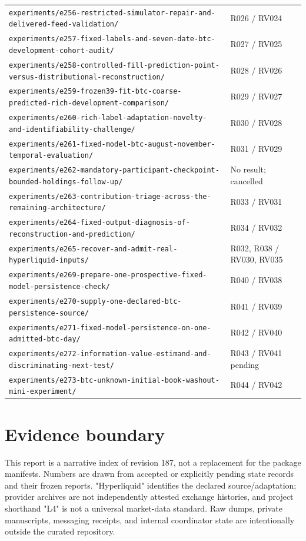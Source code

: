 \documentclass[10pt,a4paper]{article}
\begin{document}
\begin{longtable}{@{}p{}p{}@{}}
\nolinkurl{experiments/e256-restricted-simulator-repair-and-delivered-feed-validation/} & R026 / RV024\\
\nolinkurl{experiments/e257-fixed-labels-and-seven-date-btc-development-cohort-audit/} & R027 / RV025\\
\nolinkurl{experiments/e258-controlled-fill-prediction-point-versus-distributional-reconstruction/} & R028 / RV026\\
\nolinkurl{experiments/e259-frozen39-fit-btc-coarse-predicted-rich-development-comparison/} & R029 / RV027\\
\nolinkurl{experiments/e260-rich-label-adaptation-novelty-and-identifiability-challenge/} & R030 / RV028\\
\nolinkurl{experiments/e261-fixed-model-btc-august-november-temporal-evaluation/} & R031 / RV029\\
\nolinkurl{experiments/e262-mandatory-participant-checkpoint-bounded-holdings-follow-up/} & No result; cancelled\\
\nolinkurl{experiments/e263-contribution-triage-across-the-remaining-architecture/} & R033 / RV031\\
\nolinkurl{experiments/e264-fixed-output-diagnosis-of-reconstruction-and-prediction/} & R034 / RV032\\
\nolinkurl{experiments/e265-recover-and-admit-real-hyperliquid-inputs/} & R032, R038 / RV030, RV035\\
\nolinkurl{experiments/e269-prepare-one-prospective-fixed-model-persistence-check/} & R040 / RV038\\
\nolinkurl{experiments/e270-supply-one-declared-btc-persistence-source/} & R041 / RV039\\
\nolinkurl{experiments/e271-fixed-model-persistence-on-one-admitted-btc-day/} & R042 / RV040\\
\nolinkurl{experiments/e272-information-value-estimand-and-discriminating-next-test/} & R043 / RV041 pending\\
\nolinkurl{experiments/e273-btc-unknown-initial-book-washout-mini-experiment/} & R044 / RV042\\
\bottomrule\end{longtable}\endgroup
\section{Evidence boundary}
This report is a narrative index of revision 187, not a replacement for the package manifests. Numbers are drawn from accepted or explicitly pending state records and their frozen reports. "Hyperliquid" identifies the declared source/adaptation; provider archives are not independently attested exchange histories, and project shorthand "L4" is not a universal market-data standard. Raw dumps, private manuscripts, messaging receipts, and internal coordinator state are intentionally outside the curated repository.\par
\end{document}
